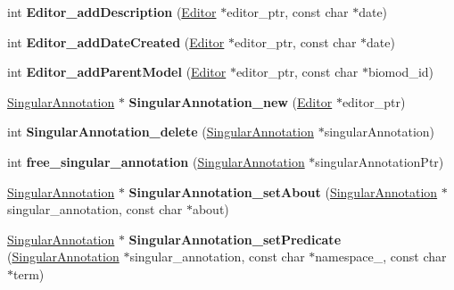 \begin{DoxyCompactItemize}
int {\bfseries Editor\+\_\+add\+Description} (\hyperlink{classomexmeta_1_1Editor}{Editor} $\ast$editor\+\_\+ptr, const char $\ast$date)
\item 
\mbox{\label{namespaceomexmeta_a438d94f9c2af78f41cfb28d92da25bd5}} 
int {\bfseries Editor\+\_\+add\+Date\+Created} (\hyperlink{classomexmeta_1_1Editor}{Editor} $\ast$editor\+\_\+ptr, const char $\ast$date)
\item 
\mbox{\label{namespaceomexmeta_a6bd3edcdc8e62d3da2ff9328280e2612}} 
int {\bfseries Editor\+\_\+add\+Parent\+Model} (\hyperlink{classomexmeta_1_1Editor}{Editor} $\ast$editor\+\_\+ptr, const char $\ast$biomod\+\_\+id)
\item 
\mbox{\label{namespaceomexmeta_a56234965820e6e731cb377af949585a3}} 
\hyperlink{classomexmeta_1_1Triple}{Singular\+Annotation} $\ast$ {\bfseries Singular\+Annotation\+\_\+new} (\hyperlink{classomexmeta_1_1Editor}{Editor} $\ast$editor\+\_\+ptr)
\item 
\mbox{\label{namespaceomexmeta_a6c1d37ce851c1853f83a3622a5bd00bc}} 
int {\bfseries Singular\+Annotation\+\_\+delete} (\hyperlink{classomexmeta_1_1Triple}{Singular\+Annotation} $\ast$singular\+Annotation)
\item 
\mbox{\label{namespaceomexmeta_ad8b1a3d657ffffadcef2d723044c18e9}} 
int {\bfseries free\+\_\+singular\+\_\+annotation} (\hyperlink{classomexmeta_1_1Triple}{Singular\+Annotation} $\ast$singular\+Annotation\+Ptr)
\item 
\mbox{\label{namespaceomexmeta_aba899b6a9b09d4d747dae983ead4eb3c}} 
\hyperlink{classomexmeta_1_1Triple}{Singular\+Annotation} $\ast$ {\bfseries Singular\+Annotation\+\_\+set\+About} (\hyperlink{classomexmeta_1_1Triple}{Singular\+Annotation} $\ast$singular\+\_\+annotation, const char $\ast$about)
\item 
\mbox{\label{namespaceomexmeta_aeedfc49054398f038e3e5dc431463ccd}} 
\hyperlink{classomexmeta_1_1Triple}{Singular\+Annotation} $\ast$ {\bfseries Singular\+Annotation\+\_\+set\+Predicate} (\hyperlink{classomexmeta_1_1Triple}{Singular\+Annotation} $\ast$singular\+\_\+annotation, const char $\ast$namespace\+\_\+, const char $\ast$term)

\end{DoxyCompactItemize}
